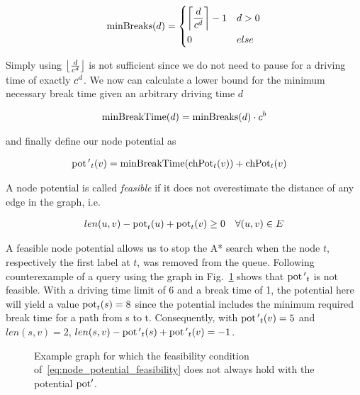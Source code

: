 \begin{align}\label{eq:min_breaks}
	\minBreaks(d) = \begin{dcases}
		\ceil*{ \frac{d}{\restr^d} } - 1 & d > 0 \\
		0                                & else
	\end{dcases}
\end{align}

Simply using $\floor*{ \frac{d}{\restr^d} }$ is not sufficient since we do not need to pause for a driving time of exactly $\restr^d$. We now can calculate a lower bound for the minimum necessary break time given an arbitrary driving time $d$

\begin{align}\label{eq:min_break_time}
	\minBreakTime(d) = \minBreaks(d) \cdot \restr^b
\end{align}

and finally define our node potential as

\begin{align}
	\begin{split}
		\concretepotential{'}_t(v) & = \minBreakTime(\chpotential_t(v)) + \chpotential_t(v)
	\end{split}
\end{align}

A node potential is called \emph{feasible} if it does not overestimate the distance of any edge in the graph, i.e.

\begin{align}
	\label{eq:node_potential_feasibility}
	len(u,v) - \concretepotential_t(u) + \concretepotential_t(v) \ge 0 \quad \forall (u,v) \in E
\end{align}

A feasible node potential allows us to stop the A* search when the node $t$, respectively the first label at $t$, was removed from the queue. Following counterexample of a query using the graph in Fig.~\ref{fig:graph_infeasible_potential} shows that $\concretepotential{'}_t$ is not feasible. With a driving time limit of 6 and a break time of 1, the potential here will yield a value $\concretepotential_t(s) = 8$ since the potential includes the minimum required break time for a path from s to t. Consequently, with $\concretepotential{'}_t(v) = 5$ and $len(s,v) = 2$, $len(s,v) - \concretepotential{'}_t(s) + \concretepotential{'}_t(v) = -1$.

\begin{figure}[hbtp]
	\centering
	
	\caption{Example graph for which the feasibility condition of~\ref{eq:node_potential_feasibility} does not always hold with the potential $\concretepotential'$.}
	\label{fig:graph_infeasible_potential}
\end{figure}


